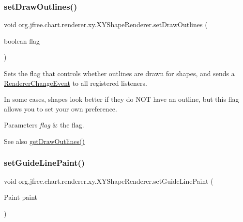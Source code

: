 \subsubsection{\texorpdfstring{set\+Draw\+Outlines()}{setDrawOutlines()}}
{\footnotesize\ttfamily void org.\+jfree.\+chart.\+renderer.\+xy.\+X\+Y\+Shape\+Renderer.\+set\+Draw\+Outlines (\begin{DoxyParamCaption}\item[{boolean}]{flag }\end{DoxyParamCaption})}

Sets the flag that controls whether outlines are drawn for shapes, and sends a \mbox{\hyperlink{}{Renderer\+Change\+Event}} to all registered listeners. 

In some cases, shapes look better if they do N\+OT have an outline, but this flag allows you to set your own preference.


\begin{DoxyParams}{Parameters}
{\em flag} & the flag.\\
\hline
\end{DoxyParams}
\begin{DoxySeeAlso}{See also}
\mbox{\hyperlink{classorg_1_1jfree_1_1chart_1_1renderer_1_1xy_1_1_x_y_shape_renderer_a2dcf93065d4bc5dfb716e6b5a9d4ddb5}{get\+Draw\+Outlines()}} 
\end{DoxySeeAlso}
\mbox{\label{classorg_1_1jfree_1_1chart_1_1renderer_1_1xy_1_1_x_y_shape_renderer_a6f45190e4da92e6cf58f841923476157}} 
\subsubsection{\texorpdfstring{set\+Guide\+Line\+Paint()}{setGuideLinePaint()}}
{\footnotesize\ttfamily void org.\+jfree.\+chart.\+renderer.\+xy.\+X\+Y\+Shape\+Renderer.\+set\+Guide\+Line\+Paint (\begin{DoxyParamCaption}\item[{Paint}]{paint }\end{DoxyParamCaption})}

